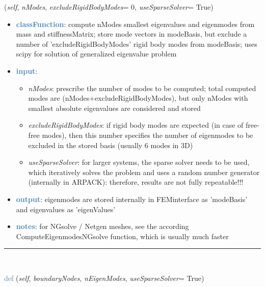 \begin{itemize}[leftmargin=1.4cm]
\begin{itemize}[leftmargin=1.4cm]
\begin{itemize}[leftmargin=1.4cm]
\begin{itemize}[leftmargin=0.5cm]
\begin{itemize}[leftmargin=1.4cm]
\begin{itemize}[leftmargin=1.4cm]
\begin{itemize}[leftmargin=1.4cm]
\begin{itemize}[leftmargin=0.5cm]
\begin{flushleft}
({\it self}, {\it nModes}, {\it excludeRigidBodyModes}= 0, {\it useSparseSolver}= True)
\end{flushleft}
\setlength{\itemindent}{0.7cm}
\begin{itemize}[leftmargin=0.7cm]
\item[--]\textcolor{steelblue}{\bf classFunction}: compute nModes smallest eigenvalues and eigenmodes from mass and stiffnessMatrix; store mode vectors in modeBasis, but exclude a number of 'excludeRigidBodyModes' rigid body modes from modeBasis; uses scipy for solution of generalized eigenvalue problem
\item[--]\textcolor{steelblue}{\bf input}: \vspace{-6pt}
\begin{itemize}[leftmargin=1.2cm]
\setlength{\itemindent}{-0.7cm}
\item[]{\it nModes}: prescribe the number of modes to be computed; total computed modes are  (nModes+excludeRigidBodyModes), but only nModes with smallest absolute eigenvalues are considered and stored
\item[]{\it excludeRigidBodyModes}: if rigid body modes are expected (in case of free-free modes), then this number specifies the number of eigenmodes to be excluded in the stored basis (usually 6 modes in 3D)
\item[]{\it useSparseSolver}: for larger systems, the sparse solver needs to be used, which iteratively solves the problem and uses a random number generator (internally in ARPACK): therefore, results are not fully repeatable!!!
\end{itemize}
\item[--]\textcolor{steelblue}{\bf output}: eigenmodes are stored internally in FEMinterface as 'modeBasis' and eigenvalues as 'eigenValues'
\item[--]\textcolor{steelblue}{\bf notes}: for NGsolve / Netgen meshes, see the according ComputeEigenmodesNGsolve function, which is usually much faster
\vspace{12pt}\end{itemize}
%
\noindent\rule{8cm}{0.75pt}\vspace{1pt} \\ 
\begin{flushleft}
\noindent \textcolor{steelblue}{def {\bf {}}}\label{sec:FEM:FEMinterface:ComputeEigenModesWithBoundaryNodes}
({\it self}, {\it boundaryNodes}, {\it nEigenModes}, {\it useSparseSolver}= True)

\end{flushleft}
\end{itemize}
\end{itemize}
\end{itemize}
\end{itemize}
\end{itemize}
\end{itemize}
\end{itemize}
\end{itemize}
